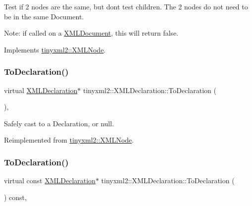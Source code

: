 Test if 2 nodes are the same, but don\textquotesingle{}t test children. The 2 nodes do not need to be in the same Document.

Note\+: if called on a \hyperlink{classtinyxml2_1_1_x_m_l_document}{X\+M\+L\+Document}, this will return false. 

Implements \hyperlink{classtinyxml2_1_1_x_m_l_node_a7ce18b751c3ea09eac292dca264f9226}{tinyxml2\+::\+X\+M\+L\+Node}.

\mbox{\label{classtinyxml2_1_1_x_m_l_declaration_a159d8ac45865215e88059ea1e5b52fc5}} 
\subsubsection{\texorpdfstring{To\+Declaration()}{ToDeclaration()}\hspace{0.1cm}{\footnotesize\ttfamily [1/2]}}
{\footnotesize\ttfamily virtual \hyperlink{classtinyxml2_1_1_x_m_l_declaration}{X\+M\+L\+Declaration}$\ast$ tinyxml2\+::\+X\+M\+L\+Declaration\+::\+To\+Declaration (\begin{DoxyParamCaption}{ }\end{DoxyParamCaption})\hspace{0.3cm}{\ttfamily [inline]}, {\ttfamily [virtual]}}



Safely cast to a Declaration, or null. 



Reimplemented from \hyperlink{classtinyxml2_1_1_x_m_l_node_a174fd4c22c010b58138c1b84a0dfbd51}{tinyxml2\+::\+X\+M\+L\+Node}.

\mbox{\label{classtinyxml2_1_1_x_m_l_declaration_aa20c3315b18c3b88830dccf5c493259b}} 
\subsubsection{\texorpdfstring{To\+Declaration()}{ToDeclaration()}\hspace{0.1cm}{\footnotesize\ttfamily [2/2]}}
{\footnotesize\ttfamily virtual const \hyperlink{classtinyxml2_1_1_x_m_l_declaration}{X\+M\+L\+Declaration}$\ast$ tinyxml2\+::\+X\+M\+L\+Declaration\+::\+To\+Declaration (\begin{DoxyParamCaption}{ }\end{DoxyParamCaption}) const\hspace{0.3cm}{\ttfamily [inline]}, {\ttfamily [virtual]}}



